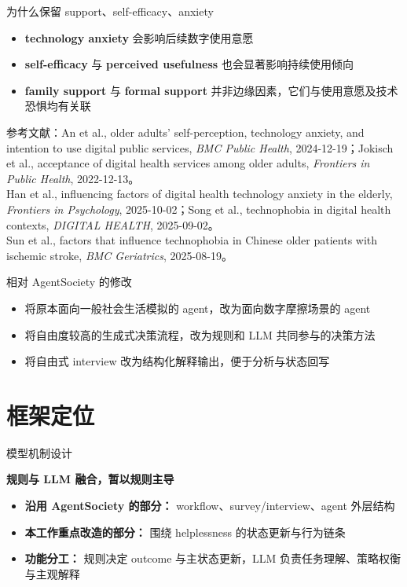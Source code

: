 \documentclass[aspectratio=169]{beamer}
\newcommand{\framebottomnote}[1]{%
    \vfill
    \par\noindent
    {\tiny\color{black!65}\parbox{0.96\linewidth}{#1}\par}%
    \vspace*{-0.75cm}%
}
\begin{document}
\begin{frame}{为什么保留 support、self-efficacy、anxiety}
    \begin{itemize}
        \item \textbf{technology anxiety} 会影响后续数字使用意愿
        \item \textbf{self-efficacy} 与 \textbf{perceived usefulness} 也会显著影响持续使用倾向
        \item \textbf{family support} 与 \textbf{formal support} 并非边缘因素，它们与使用意愿及技术恐惧均有关联
    \end{itemize}
    \framebottomnote{参考文献：An et al., older adults' self-perception, technology anxiety, and intention to use digital public services, \textit{BMC Public Health}, 2024-12-19；Jokisch et al., acceptance of digital health services among older adults, \textit{Frontiers in Public Health}, 2022-12-13。\\Han et al., influencing factors of digital health technology anxiety in the elderly, \textit{Frontiers in Psychology}, 2025-10-02；Song et al., technophobia in digital health contexts, \textit{DIGITAL HEALTH}, 2025-09-02。\\Sun et al., factors that influence technophobia in Chinese older patients with ischemic stroke, \textit{BMC Geriatrics}, 2025-08-19。}
\end{frame}

\begin{frame}{相对 AgentSociety 的修改}
    \begin{itemize}
        \item 将原本面向一般社会生活模拟的 agent，改为面向数字摩擦场景的 agent
        \item 将自由度较高的生成式决策流程，改为规则和 LLM 共同参与的决策方法
        \item 将自由式 interview 改为结构化解释输出，便于分析与状态回写
    \end{itemize}
\end{frame}

\section{框架定位}

\begin{frame}{模型机制设计}
    \begin{center}
        \Large \textbf{规则与 LLM 融合，暂以规则主导}
    \end{center}
    \vspace{0.15cm}
    \begin{itemize}
        \item \textbf{沿用 AgentSociety 的部分：} workflow、survey/interview、agent 外层结构
        \item \textbf{本工作重点改造的部分：} 围绕 helplessness 的状态更新与行为链条
        \item \textbf{功能分工：} 规则决定 outcome 与主状态更新，LLM 负责任务理解、策略权衡与主观解释
    \end{itemize}
\end{frame}
\end{document}

